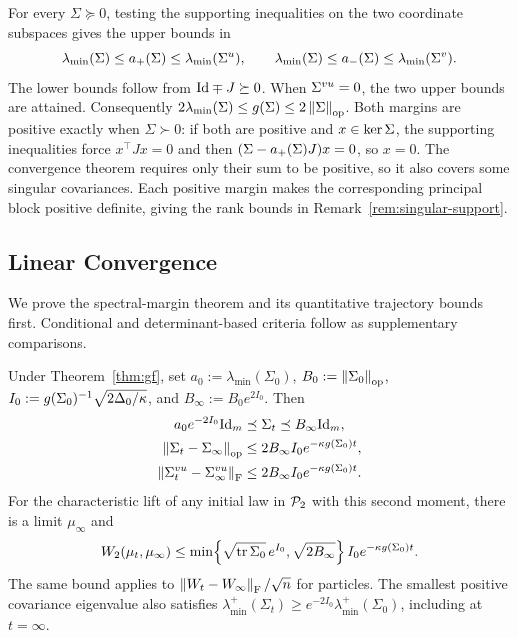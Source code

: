 \begin{remark}
For every $\Sigma\succeq0$, testing the supporting inequalities on the two
coordinate subspaces gives the upper bounds in
\[
 \lambda_{\min}(\Sigma)\le a_+(\Sigma)\le\lambda_{\min}(\Sigma^u),\qquad
 \lambda_{\min}(\Sigma)\le a_-(\Sigma)\le\lambda_{\min}(\Sigma^v).
\]
The lower bounds follow from $\mathrm{Id}\mp J\succeq0$.
When $\Sigma^{vu}=0$, the two upper bounds are attained.
Consequently $2\lambda_{\min}(\Sigma)\le g(\Sigma)\le2\left\lVert \Sigma \right\rVert_{\mathrm{op}}$.
Both margins are positive exactly when $\Sigma\succ0$: if both are
positive and $x\in\operatorname{ker}\Sigma$, the supporting inequalities force
$x^\top Jx=0$ and then $(\Sigma-a_+(\Sigma)J)x=0$, so $x=0$.
The convergence theorem requires only their sum to be positive, so it
also covers some singular covariances. Each positive margin makes the
corresponding principal block positive definite, giving the rank bounds
in Remark~\ref{rem:singular-support}.
\end{remark}

\subsection{Linear Convergence}\label{app:gf}
We prove the spectral-margin theorem and its quantitative trajectory
bounds first. Conditional and determinant-based criteria follow as
supplementary comparisons.

\begin{proposition}\label{prop:gf-lift-tail}
Under Theorem~\ref{thm:gf}, set
$a_0:=\lambda_{\min}(\Sigma_0)$, $B_0:=\left\lVert \Sigma_0 \right\rVert_{\mathrm{op}}$,
$I_0:=g(\Sigma_0)^{-1}\sqrt{2\Delta_0/\kappa}$, and $B_\infty:=B_0e^{2I_0}$.
Then
\begin{align}
 a_0e^{-2I_0}\mathrm{Id}_m&\preceq\Sigma_t\preceq B_\infty\mathrm{Id}_m,\label{eq:gf-tube}\\
 \left\lVert \Sigma_t-\Sigma_\infty \right\rVert_{\mathrm{op}}
 &\le2B_\infty I_0e^{-\kappa g(\Sigma_0)t},\label{eq:gf-tail}\\
 \left\lVert \Sigma^{vu}_t-\Sigma^{vu}_\infty \right\rVert_{\mathrm{F}}
 &\le2B_\infty I_0e^{-\kappa g(\Sigma_0)t}.\label{eq:gf-predictor-tail}
\end{align}
For the characteristic lift of any initial law in $\mathcal P_2$ with this
second moment, there is a limit $\mu_\infty$ and
\begin{equation}\label{eq:gf-w2}
 W_2(\mu_t,\mu_\infty)
 \le\min\!\left\{\sqrt{\operatorname{tr}\Sigma_0}\,e^{I_0},\sqrt{2B_\infty}\right\}
       I_0e^{-\kappa g(\Sigma_0) t}.
\end{equation}
The same bound applies to $\left\lVert W_t-W_\infty \right\rVert_{\mathrm{F}}/\sqrt n$ for particles.
The smallest positive covariance eigenvalue also satisfies
$\lambda_{\min}^{+}(\Sigma_t)\ge
e^{-2I_0}\lambda_{\min}^{+}(\Sigma_0)$, including at $t=\infty$.
\end{proposition}

